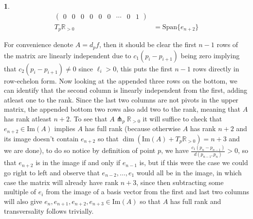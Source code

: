 \documentclass[10.5pt]{article}
\theoremstyle{definition}
\newtheorem{pb}{}
\newcommand{\set}[1]{\{#1\}}
\begin{document}
\begin{pb}
\begin{align*}
\begin{pmatrix}
                0 & 0 & 0 & 0 & 0 & 0 & \cdots & 0 & 1 
            \end{pmatrix} \\
            T_p\mathbb{R}_{>0} &= \text{Span}\set{e_{n+2}}
        \end{align*}
    \end{pb}
    For convenience denote \(A = d_pf\), then it should be clear the first \(n-1\) rows of the matrix are linearly independent due to \(c_1(p_i - p_{i+1})\) being zero implying that \(c_2(p_i - p_{i+1}) \neq 0\) since \(\ell_i > 0\), this puts the first \(n-1\) rows directly in row-echelon form. Now looking at the appended three rows on the bottom, we can identify that the second column is linearly independent from the first, adding atleast one to the rank. Since the last two columns are not pivots in the upper matrix, the appended bottom two rows also add two to the rank, meaning that \(A\) has rank atleast \(n + 2\). To see that \(A\pitchfork_p \mathbb{R}_{>0}\) it will suffice to check that \(e_{n+2} \in \text{Im}(A)\) implies \(A\) has full rank (because otherwise \(A\) has rank \(n+2\) and its image doesn't contain \(e_{n+2}\) so that \(\dim(\text{Im}(A) + T_p \mathbb{R}_{>0})=n+3\) and we are done), to do so notice by definition of point \(p\), we have \(\frac{c_1(p_n - p_{n-1})}{d(p_{n-1},p_n)} > 0\), so that \(e_{n+2}\) is in the image if and only if \(e_{n-1}\) is, but if this were the case we could go right to left and observe that \(e_{n-2}, \hdots , e_1\) would all be in the image, in which case the matrix will already have rank \(n + 3\), since then subtracting some multiple of \(e_i\) from the image of a basis vector from the first and last two columns will also give \(e_n,e_{n+1},e_{n+2},e_{n+3} \in \text{Im}(A)\) so that \(A\) has full rank and transversality follows trivially.
    
\end{document}
